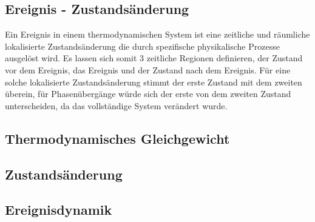 \subsection{Ereignis - Zustandsänderung}
\label{sec:theory-event}

Ein Ereignis in einem thermodynamischen System ist eine zeitliche und räumliche lokalisierte Zustandsänderung die durch spezifische physikalische Prozesse ausgelöst wird. Es lassen sich somit 3 zeitliche Regionen definieren, der Zustand vor dem Ereignis, das Ereignis und der Zustand nach dem Ereignis. Für eine solche lokalisierte Zustandsänderung stimmt der erste Zustand mit dem zweiten überein, für Phasenübergänge würde sich der erste von dem zweiten Zustand unterscheiden, da das vollständige System verändert wurde.

\subsection{Thermodynamisches Gleichgewicht}

\subsection{Zustandsänderung}

\subsection{Ereignisdynamik}
